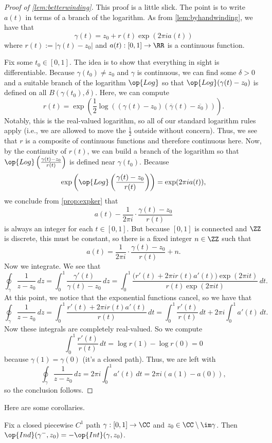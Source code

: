 \begin{proof}[Proof of \autoref{lem:betterwinding}]
	This proof is a little slick. The point is to write $a(t)$ in terms of a branch of the logarithm. As from \autoref{lem:byhandwinding}, we have that
	\[\gamma(t)=z_0+r(t)\exp(2\pi ia(t))\]
	where $r(t):=|\gamma(t)-z_0|$ and $a(t):[0,1]\to\RR$ is a continuous function.

	Fix some $t_0\in[0,1]$. The idea is to show that everything in sight is differentiable. Because $\gamma(t_0)\ne z_0$ and $\gamma$ is continuous, we can find some $\delta>0$ and a suitable branch of the logarithm $\op{Log}$ so that $\op{Log}(\gamma(t)-z_0)$ is defined on all $B(\gamma(t_0),\delta)$. Here, we can compute
	\[r(t)=\exp\left(\frac12\log\left((\gamma(t)-z_0)(\overline\gamma(t)-\overline{z_0})\right)\right).\]
	Notably, this is the real-valued logarithm, so all of our standard logarithm rules apply (i.e., we are allowed to move the $\frac12$ outside without concern). Thus, we see that $r$ is a composite of continuous functions and therefore continuous here. Now, by the continuity of $r(t)$, we can build a branch of the logarithm so that $\op{Log}\left(\frac{\gamma(t)-z_0}{r(t)}\right)$ is defined near $\gamma(t_0)$. Because
	\[\exp\left(\op{Log}\left(\frac{\gamma(t)-z_0}{r(t)}\right)\right)=\exp(2\pi ia(t)),\]
	we conclude from \autoref{prop:expker} that
	\[a(t)-\frac1{2\pi i}\cdot\frac{\gamma(t)-z_0}{r(t)}\]
	is always an integer for each $t\in[0,1]$. But because $[0,1]$ is connected and $\ZZ$ is discrete, this must be constant, so there is a fixed integer $n\in\ZZ$ such that
	\[a(t)=\frac1{2\pi i}\cdot\frac{\gamma(t)-z_0}{r(t)}+n.\]
	Now we integrate. We see that
	\[\oint_\gamma\frac1{z-z_0}\,dz=\int_0^1\frac{\gamma'(t)}{\gamma(t)-z_0}\,dz=\int_0^1\frac{\big(r'(t)+2\pi ir(t)a'(t)\big)\exp(2\pi it)}{r(t)\exp(2\pi it)}\,dt.\]
	At this point, we notice that the exponential functions cancel, so we have that
	\[\oint_\gamma\frac1{z-z_0}\,dz=\int_0^1\frac{r'(t)+2\pi ir(t)a'(t)}{r(t)}\,dt=\int_0^1\frac{r'(t)}{r(t)}\,dt+2\pi i\int_0^1a'(t)\,dt.\]
	Now these integrals are completely real-valued. So we compute
	\[\int_0^1\frac{r'(t)}{r(t)}\,dt=\log r(1)-\log r(0)=0\]
	because $\gamma(1)=\gamma(0)$ (it's a closed path). Thus, we are left with
	\[\oint_\gamma\frac1{z-z_0}\,dz=2\pi i\int_0^1a'(t)\,dt=2\pi i(a(1)-a(0)),\]
	so the conclusion follows.
\end{proof}
Here are some corollaries.
\begin{corollary}
	Fix a closed piecewise $C^1$ path $\gamma:[0,1]\to\CC$ and $z_0\in\CC\setminus\im\gamma$. Then $\op{Ind}(\gamma^-,z_0)=-\op{Int}(\gamma,z_0)$.
\end{corollary}
